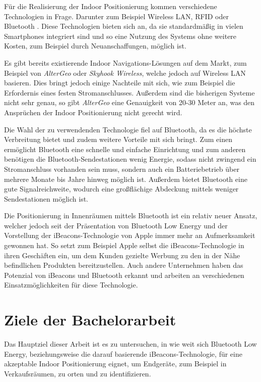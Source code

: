 Für die Realisierung der Indoor Positionierung kommen verschiedene Technologien in Frage. Darunter zum Beispiel Wireless LAN, RFID oder Bluetooth \cite{positioningOverview}.
Diese Technologien bieten sich an, da sie standardmäßig in vielen Smartphones integriert sind und so eine Nutzung des Systems ohne weitere Kosten, zum Beispiel durch Neuanschaffungen, möglich ist.

Es gibt bereits existierende Indoor Navigations-Lösungen auf dem Markt, zum Beispiel von \emph{AlterGeo} oder \emph{Skyhook Wireless}, welche jedoch auf Wireless LAN basieren. Dies bringt jedoch einige Nachteile mit sich, wie zum Beispiel die Erfordernis eines festen Stromanschlusses. Außerdem sind die bisherigen Systeme nicht sehr genau, so gibt \emph{AlterGeo} eine Genauigkeit von 20-30 Meter an, was den Ansprüchen der Indoor Positionierung nicht gerecht wird.

Die Wahl der zu verwendenden Technologie fiel auf Bluetooth, da es die höchste Verbreitung bietet und zudem weitere Vorteile mit sich bringt. Zum einen ermöglicht Bluetooth eine schnelle und einfache Einrichtung und zum anderen benötigen die Bluetooth-Sendestationen wenig Energie, sodass nicht zwingend ein Stromanschluss vorhanden sein muss, sondern auch ein Batteriebetrieb über mehrere Monate bis Jahre hinweg möglich ist.
Außerdem bietet Bluetooth eine gute Signalreichweite, wodurch eine großflächige Abdeckung mittels weniger Sendestationen möglich ist.

Die Positionierung in Innenräumen mittels Bluetooth ist ein relativ neuer Ansatz, welcher jedoch seit der Präsentation von Bluetooth Low Energy und der Vorstellung der iBeacons-Technologie von Apple immer mehr an Aufmerksamkeit gewonnen hat. So setzt zum Beispiel Apple selbst die iBeacons-Technologie in ihren Geschäften ein, um dem Kunden gezielte Werbung zu den in der Nähe befindlichen Produkten bereitzustellen. Auch andere Unternehmen haben das Potenzial von iBeacons und Bluetooth erkannt und arbeiten an verschiedenen Einsatzmöglichkeiten für diese Technologie.

\section{Ziele der Bachelorarbeit}
\label{sec:introduction:goal}

Das Hauptziel dieser Arbeit ist es zu untersuchen, in wie weit sich Bluetooth Low Energy, beziehungsweise die darauf basierende iBeacons-Technologie, für eine akzeptable Indoor Positionierung eignet, um Endgeräte, zum Beispiel in Verkaufsräumen, zu orten und zu identifizieren.

